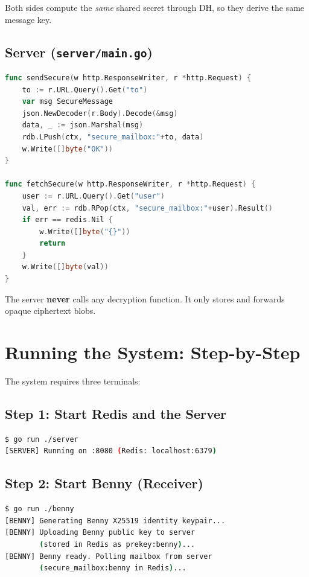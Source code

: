 \documentclass[12pt,a4paper]{article}
\begin{document}
Both sides compute the \textit{same} shared secret through DH, so they derive the same message key.

\subsection{Server (\texttt{server/main.go})}

\begin{lstlisting}[language=Go, caption={Server -- message relay handlers.}]
func sendSecure(w http.ResponseWriter, r *http.Request) {
    to := r.URL.Query().Get("to")
    var msg SecureMessage
    json.NewDecoder(r.Body).Decode(&msg)
    data, _ := json.Marshal(msg)
    rdb.LPush(ctx, "secure_mailbox:"+to, data)
    w.Write([]byte("OK"))
}

func fetchSecure(w http.ResponseWriter, r *http.Request) {
    user := r.URL.Query().Get("user")
    val, err := rdb.RPop(ctx, "secure_mailbox:"+user).Result()
    if err == redis.Nil {
        w.Write([]byte("{}"))
        return
    }
    w.Write([]byte(val))
}
\end{lstlisting}

The server \textbf{never} calls any decryption function. It only stores and forwards opaque ciphertext blobs.

\section{Running the System: Step-by-Step}
\label{sec:running}

The system requires three terminals:

\subsection{Step 1: Start Redis and the Server}
\begin{lstlisting}[language=bash, caption={Starting the relay server.}]
$ go run ./server
[SERVER] Running on :8080 (Redis: localhost:6379)
\end{lstlisting}

\subsection{Step 2: Start Benny (Receiver)}
\begin{lstlisting}[language=bash, caption={Benny starts and uploads his public key.}]
$ go run ./benny
[BENNY] Generating Benny X25519 identity keypair...
[BENNY] Uploading Benny public key to server
        (stored in Redis as prekey:benny)...
[BENNY] Benny ready. Polling mailbox from server
        (secure_mailbox:benny in Redis)...
\end{lstlisting}
\end{document}
